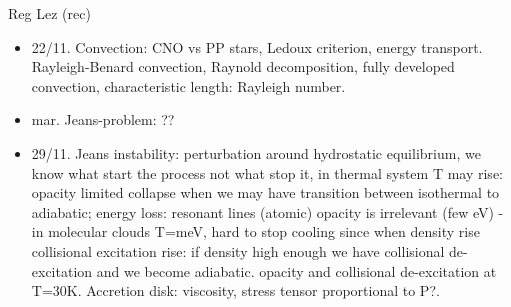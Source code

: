 \begin{frame}[allowframebreaks]{Reg Lez (rec)}
\begin{itemize}
\item 22/11. Convection: CNO vs PP stars, Ledoux criterion, energy transport. Rayleigh-Benard convection, Raynold decomposition, fully developed convection, characteristic length: Rayleigh number.

\item mar. Jeans-problem: ??

\item 29/11. Jeans instability: perturbation around hydrostatic equilibrium, we know what start the process not what stop it, in thermal system T may rise: opacity limited collapse when we may have transition between isothermal to adiabatic; energy loss: resonant lines (atomic) opacity is irrelevant (few eV) - in molecular clouds T=meV, hard to stop cooling since when density rise collisional excitation rise: if density high enough we have collisional de-excitation and we become adiabatic. 
opacity and collisional de-excitation at T=30K. Accretion disk: viscosity, stress tensor proportional to P?.

\end{itemize}

\end{frame}